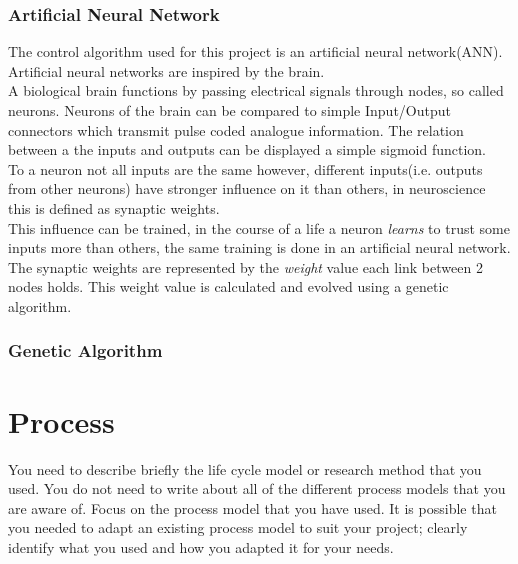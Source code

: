 \subsubsection{Artificial Neural Network}
The control algorithm used for this project is an artificial neural network(ANN).
Artificial neural networks are inspired by the brain. \\
A biological brain functions by passing electrical signals through nodes, so called neurons. Neurons of the brain can be compared to simple Input/Output connectors which transmit pulse coded analogue information. The relation between a the inputs and outputs can be displayed a simple sigmoid function\cite{Hopfield}.\\
To a neuron not all inputs are the same however, different inputs(i.e. outputs from other neurons) have stronger influence on it than others, in neuroscience this is defined as synaptic weights. \\
This influence can be trained, in the course of a life a neuron \textit{learns} to trust some inputs more than others, the same training is done in an artificial neural network. The synaptic weights are represented by the \textit{weight} value each link between 2 nodes holds. This weight value is calculated and evolved using a genetic algorithm. 

\subsubsection{Genetic Algorithm}



\section{Process}
You need to describe briefly the life cycle model or research method that you used. You do not need to write about all of the different process models that you are aware of. Focus on the process model that you have used. It is possible that you needed to adapt an existing process model to suit your project; clearly identify what you used and how you adapted it for your needs.\\



